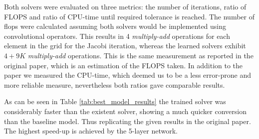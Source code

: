 Both solvers were evaluated on three metrics: the number of iterations, ratio of FLOPS and ratio of CPU-time until required tolerance is reached. The number of flops were calculated assuming both solvers would be implemented using convolutional operators. This results in 4 \textit{multiply-add} operations for each element in the grid for the Jacobi iteration, whereas the learned solvers exhibit $4+9K$ \textit{multiply-add} operations. This is the same measurement as reported in the original paper, which is an estimation of the FLOPS taken. In addition to the paper we measured the CPU-time, which deemed us to be a less error-prone and more reliable measure, nevertheless both ratios gave comparable results.

As can be seen in Table \ref{tab:best_model_results} the trained solver was considerably faster than the existent solver, showing a much quicker conversion than the baseline model. Thus replicating the given results in the original paper. The highest speed-up is achieved by the 5-layer network.

